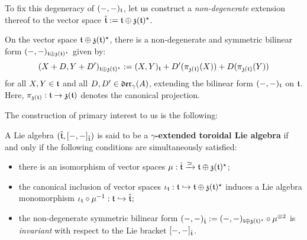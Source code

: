         To fix this degeneracy of $(-, -)_{\mathfrak{t}}$, let us construct a \textit{non-degenerate} extension thereof to the vector space $\hat{\mathfrak{t}} := \mathfrak{t} \oplus \mathfrak{z}(\mathfrak{t})^{\star}$.
        \begin{lemma} \label{lemma: extended_toroidal_bilinear_form}
            On the vector space $\mathfrak{t} \oplus \mathfrak{z}(\mathfrak{t})^{\star}$, there is a non-degenerate and symmetric bilinear form $(-, -)_{\mathfrak{t} \oplus \mathfrak{z}(\mathfrak{t})^{\star}}$ given by:
                $$( X + D, Y + D' )_{\mathfrak{t} \oplus \mathfrak{z}(\mathfrak{t})^{\star}} := (X, Y)_{\mathfrak{t}} + D'( \pi_{\mathfrak{z}(\mathfrak{t})}(X) ) + D( \pi_{\mathfrak{z}(\mathfrak{t})}(Y) )$$
            for all $X, Y \in \mathfrak{t}$ and all $D, D' \in \mathfrak{der}_{\gamma}(A)$, extending the bilinear form $(-, -)_{\mathfrak{t}}$ on $\mathfrak{t}$. Here, $\pi_{\mathfrak{z}(\mathfrak{t})}: \mathfrak{t} \to \mathfrak{z}(\mathfrak{t})$ denotes the canonical projection.
        \end{lemma}

        The construction of primary interest to us is the following:
        \begin{definition} \label{def: yangian_extended_toroidal_lie_algebras}
            A Lie algebra $(\hat{\mathfrak{t}}, [-, -]_{\hat{\mathfrak{t}}})$ is said to be a \textbf{$\gamma$-extended toroidal Lie algebra} if and only if the following conditions are simultaneously satisfied:
            \begin{itemize}
                \item there is an isomorphism of vector spaces $\mu: \hat{\mathfrak{t}} \xrightarrow[]{\simeq} \mathfrak{t} \oplus \mathfrak{z}(\mathfrak{t})^{\star}$;
                \item the canonical inclusion of vector spaces $\iota_{\mathfrak{t}}: \mathfrak{t} \hookrightarrow \mathfrak{t} \oplus \mathfrak{z}(\mathfrak{t})^{\star}$ induces a Lie algebra monomorphism $\iota_{\mathfrak{t}} \circ \mu^{-1}: \mathfrak{t} \hookrightarrow \hat{\mathfrak{t}}$;
                \item the non-degenerate symmetric bilinear form $(-, -)_{\extendedtoroidal} := (-, -)_{\toroidal \oplus \z(\toroidal)^{\star}} \circ \mu^{\tensor 2}$ is \textit{invariant} with respect to the Lie bracket $[-, -]_{\hat{\mathfrak{t}}}$.
            \end{itemize}
        \end{definition}